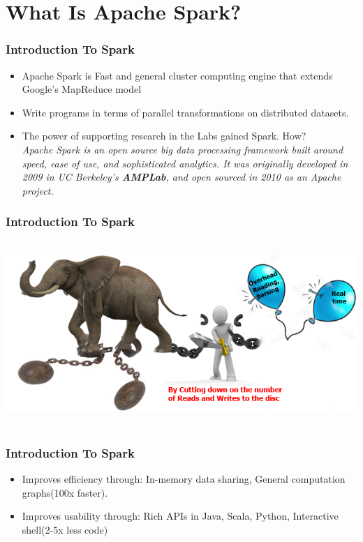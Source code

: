 
\section{What Is Apache Spark?}
\begin{frame}
  \frametitle{Introduction To Spark}
	\begin{itemize}[<+->]
		\item Apache Spark is Fast and general cluster computing engine that extends Google’s MapReduce model
		\item Write programs in terms of parallel transformations on distributed datasets.
		\item The power of supporting research in the Labs gained Spark. How? \\ \textit{Apache Spark is an open source big data processing framework built around speed, ease of use, and sophisticated analytics. It was originally developed in 2009 in UC Berkeley’s \textbf{AMPLab}, and open sourced in 2010 as an Apache project.}

	\end{itemize}%

\end{frame}

\begin{frame}
  \frametitle{Introduction To Spark}
		\includegraphics[width=\textwidth,height=7cm]{Graphics/Sparkvsmapreduce.png}
\end{frame}


\begin{frame}
  \frametitle{Introduction To Spark}
	\begin{itemize}[<+->]
		\item Improves efficiency through: In-memory data sharing, General computation graphs(100x faster).
		\item Improves usability through: Rich APIs in Java, Scala, Python, Interactive shell(2-5x less code)
	\end{itemize}
\end{frame}

